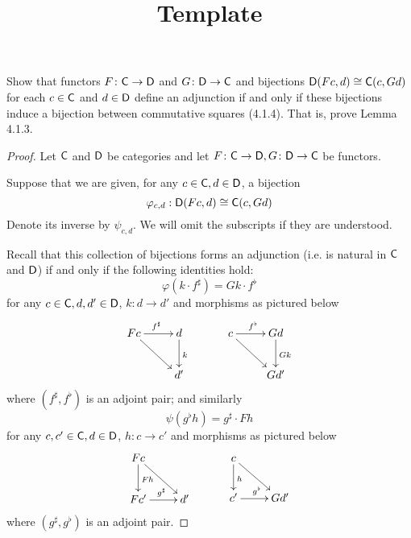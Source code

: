 \documentclass[../../solutions]{subfiles}
\title{Template}
\author{}
\begin{document}
\maketitle

%   

\begin{exercise}
Show that functors ${F}\colon{\mathsf{C}}\to{\mathsf{D}}$ and ${G}\colon{\mathsf{D}}\to{\mathsf{C}}$ and bijections $\mathsf{D}(Fc, d) \cong \mathsf{C}(c, Gd)$ for each $c \in \mathsf{C}$ and $d \in \mathsf{D}$ define an adjunction if and only if these bijections induce a bijection between commutative squares (4.1.4). That is, prove Lemma 4.1.3.
\end{exercise}

\begin{proof}

Let $\mathsf{C}$ and $\mathsf{D}$ be categories and let ${F}\colon{\mathsf{C}}\to{\mathsf{D}} , {G}\colon{\mathsf{D}}\to{\mathsf{C}}$ be functors.

Suppose that we are given, for any $c\in \mathsf{C}, d \in \mathsf{D}$, a bijection \[ \varphi_{c,d}: \mathsf{D}(Fc, d) \cong \mathsf{C}(c, Gd) \]
Denote its inverse by $\psi_{c,d}$. We will omit the subscripts if they are understood.

Recall that this collection of bijections forms an adjunction (i.e. is natural in $\mathsf{C}$ and $\mathsf{D}$) if and only if the following identities hold:
\begin{equation} \label{4-1-1-adj1}
\varphi(k\cdot f^\sharp) = Gk \cdot f^\flat
\end{equation}
for any $c \in \mathsf{C}, d, d' \in \mathsf{D}$, $k : d\to d'$ and morphisms as pictured below
\[
\xymatrix{
 Fc\ar[dr] \ar[r]^{f^\sharp} & d \ar[d]^{k}\\
  & d'
} \ \ \ \ \ \ \ \ \ 
\xymatrix{
 c\ar[dr] \ar[r]^{f^\flat} & Gd \ar[d]^{Gk}\\
 & Gd'
} 
\]
where $(f^\sharp, f^\flat)$ is an adjoint pair; and similarly
\begin{equation} \label{4-1-1-adj2}
\psi(g^\flat  h) = g^\sharp \cdot Fh
\end{equation}
for any $c,c'\in \mathsf{C}, d \in \mathsf{D}$, $h : c \to c'$ and morphisms as pictured below
\[
\xymatrix{
 Fc\ar[d]^{Fh} \ar[dr] & \\
 Fc'\ar[r]^{g^\sharp} & d'
} \ \ \ \ \ \ \ \ \ 
\xymatrix{
 c\ar[d]^{h} \ar[dr] & \\
 c'\ar[r]^{g^\flat} & Gd'
} 
\]
where $(g^\sharp, g^\flat)$ is an adjoint pair.


\end{proof}
\end{document}
